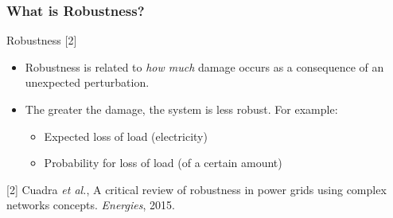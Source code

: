\documentclass{beamer}
\begin{document}
\begin{frame}
\frametitle{What is Robustness?}
\begin{block}{Robustness \small[2]}
\begin{itemize}
	\item Robustness is related to \emph{how much} damage occurs as a consequence of an unexpected perturbation. \pause 
    \item The greater the damage, the system is less robust. For example:
	\begin{itemize}
		\item Expected loss of load (electricity)
		\item Probability for loss of load (of a certain amount)
	\end{itemize} %
\end{itemize}
\end{block}
\vspace{0.2in}
\tiny [2] Cuadra \emph{et al.}, A critical review of robustness in power grids using complex networks concepts. \emph{Energies}, 2015.
\end{frame}

\end{document}
